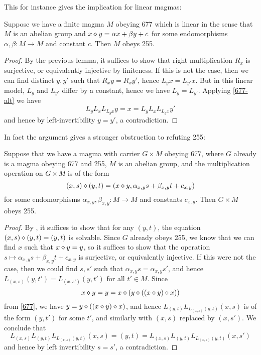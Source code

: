 This for instance gives the implication for linear magmas:

\begin{lemma}\label{linear-obstruction}  Suppose we have a finite magma $M$ obeying 677 which is linear in the sense that $M$ is an abelian group and $x \diamond y = \alpha x + \beta y + c$ for some endomorphisms $\alpha,\beta: M \to M$ and constant $c$.  Then $M$ obeys 255.
\end{lemma}

\begin{proof}  By the previous lemma, it suffices to show that right multiplication $R_x$ is surjective, or equivalently injective by finiteness.  If this is not the case, then we can find distinct $y,y'$ such that $R_x y = R_x y'$, hence $L_y x = L_{y'} x$. But in this linear model, $L_y$ and $L_{y'}$ differ by a constant, hence we have $L_y = L_{y'}$.  Applying \eqref{677-alt} we have
$$  L_y L_x L_{L_y x} y = x =  L_y L_x L_{L_y x} y'$$
and hence by left-invertibility $y=y'$, a contradiction.
\end{proof}

In fact the argument gives a stronger obstruction to refuting 255:

\begin{lemma}\label{linear-2} Suppose that we have a magma with carrier $G \times M$ obeying 677, where $G$ already is a magma obeying 677 and 255, $M$ is an abelian group, and the multiplication operation on $G \times M$ is of the form
  $$ (x,s) \diamond (y,t) = (x \diamond y, \alpha_{x,y} s + \beta_{x,y} t + c_{x,y})$$
for some endomorphisms $\alpha_{x,y},\beta_{x,y}: M \to M$ and constants $c_{x,y}$.  Then $G \times M$ obeys 255.
\end{lemma}

\begin{proof}  By , it suffices to show that for any $(y,t)$, the equation $(x,s) \diamond (y,t) = (y,t)$ is solvable.  Since $G$ already obeys 255, we know that we can find $x$ such that $x \diamond y = y$, so it suffices to show that the operation $s \mapsto \alpha_{x,y} s + \beta_{x,y} t + c_{x,y}$ is surjective, or equivalently injective.  If this were not the case, then we could find $s,s'$ such that $\alpha_{x,y} s = \alpha_{x,y} s'$, and hence $L_{(x,s)} (y,t') = L_{(x,s')} (y,t')$ for all $t' \in M$.  Since
  $$ x \diamond y = y = x \diamond (y \diamond ((x \diamond y) \diamond x))$$
  from \eqref{677}, we have $y = y \diamond ((x \diamond y) \diamond x)$, and hence $L_{(y,t)} L_{L_{(x,s)} (y,t)} (x,s)$ is of the form $(y,t')$ for some $t'$, and similarly with $(x,s)$ replaced by $(x,s')$.  We conclude that
$$ L_{(x,s)} L_{(y,t)} L_{L_{(x,s)} (y,t)} (x,s) = (y,t) =
L_{(x,s)} L_{(y,t)} L_{L_{(x,s)} (y,t)} (x,s')$$
and hence by left invertibility $s=s'$, a contradiction.
\end{proof}

